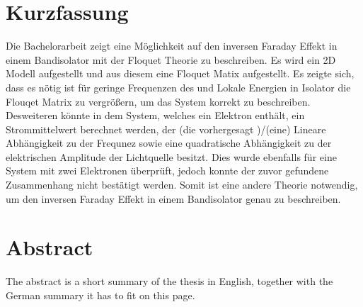 \thispagestyle{plain}

\section*{Kurzfassung}
Die Bachelorarbeit zeigt eine Möglichkeit auf den inversen Faraday Effekt
in einem Bandisolator
mit der Floquet Theorie zu beschreiben.
Es wird ein 2D Modell aufgestellt und aus diesem
eine Floquet Matix aufgestellt.
Es zeigte sich, dass es nötig ist für geringe Frequenzen des und Lokale Energien in Isolator die Flouqet Matrix
zu vergrößern, um das System korrekt zu beschreiben.
Desweiteren könnte in dem System, welches ein Elektron enthält, ein Strommittelwert
berechnet werden, der (die vorhergesagt )/(eine) Lineare Abhängigkeit
zu der Frequnez sowie eine quadratische Abhängigkeit
zu der elektrischen Amplitude der Lichtquelle besitzt.
Dies wurde ebenfalls für eine System mit zwei Elektronen überprüft,
jedoch konnte der zuvor gefundene Zusammenhang nicht bestätigt werden.
Somit ist eine andere Theorie notwendig, um den inversen Faraday Effekt
in einem Bandisolator genau zu beschreiben.


\section*{Abstract}
\begin{english}
The abstract is a short summary of the thesis in English, together with the German summary it has to fit on this page.

\end{english}
